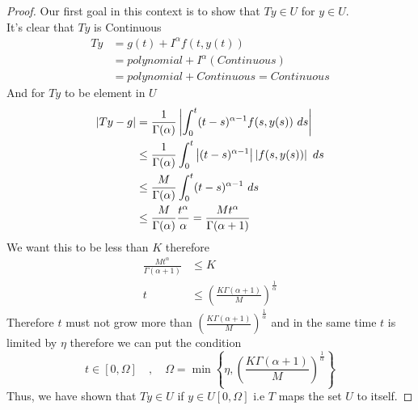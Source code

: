 \begin{proof}[Proof]
    Our first goal in this context is to show that $Ty \in U$ for $y \in U$. 
    \\
    It's clear that $Ty$ is Continuous
    \begin{align*}
        Ty &= g(t) + I^\alpha f(t,y(t)) 
        \\
        &= polynomial + I^\alpha (Continuous) 
        \\
        &= polynomial + Continuous = Continuous
    \end{align*}
    And for $Ty$ to be element in $U$ 
    \begin{align*}
        |Ty - g| &= \frac{1}{\Gamma(\alpha)} \left|\int_{0}^{t} (t-s)^{\alpha-1}f(s,y(s)) \,\, ds\right|
        \\
        &\leq \frac{1}{\Gamma(\alpha)} \int_{0}^{t} \left|(t-s)^{\alpha-1}\right|\left|f(s,y(s))\right| \,\, ds
        \\
        &\leq \frac{M}{\Gamma(\alpha)} \int_{0}^{t} (t-s)^{\alpha-1}\,\, ds
        \\
        &\leq \frac{M}{\Gamma(\alpha)} \frac{t^\alpha}{\alpha} = \frac{M t^\alpha}{\Gamma(\alpha+1)}
    \end{align*}
    We want this to be less than $K$ therefore 
    \begin{align*}
        \frac{M t^\alpha}{\Gamma(\alpha+1)} &\leq K
        \\
        t &\leq \left(\frac{K\Gamma(\alpha+1)}{M}\right)^{\frac{1}{\alpha}}
    \end{align*}
    Therefore $t$ must not grow more than $\displaystyle \left(\frac{K\Gamma(\alpha+1)}{M}\right)^{\frac{1}{\alpha}}$ and in the same time 
    $t$ is limited by $\eta$ therefore we can put the condition
    \[
        t \in [0 , \Omega] \quad,\quad \Omega = \min\left\{\eta , \left(\frac{K\Gamma(\alpha+1)}{M}\right)^{\frac{1}{\alpha}} \right\}
    \]
    Thus, we have shown that $Ty \in U$ if $y \in U[0,\Omega]$ i.e $T$ maps the set $U$ to itself.


\end{proof}
